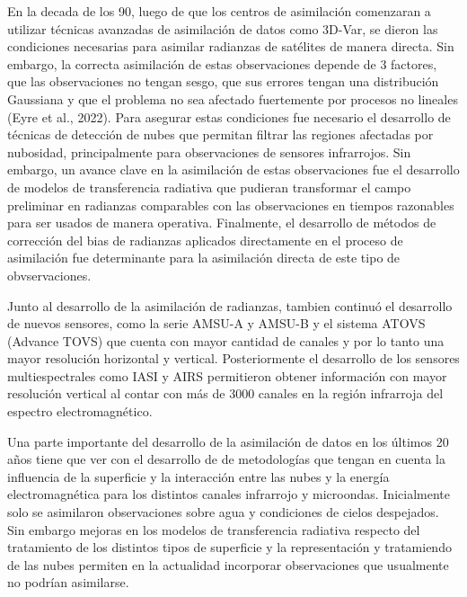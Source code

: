 \documentclass[12pt,twoside]{reedthesis}
\begin{document}
En la decada de los 90, luego de que los centros de asimilación comenzaran a utilizar técnicas avanzadas de asimilación de datos como 3D-Var, se dieron las condiciones necesarias para asimilar radianzas de satélites de manera directa. Sin embargo, la correcta asimilación de estas observaciones depende de 3 factores, que las observaciones no tengan sesgo, que sus errores tengan una distribución Gaussiana y que el problema no sea afectado fuertemente por procesos no lineales (Eyre et al., 2022). Para asegurar estas condiciones fue necesario el desarrollo de técnicas de detección de nubes que permitan filtrar las regiones afectadas por nubosidad, principalmente para observaciones de sensores infrarrojos. Sin embargo, un avance clave en la asimilación de estas observaciones fue el desarrollo de modelos de transferencia radiativa que pudieran transformar el campo preliminar en radianzas comparables con las observaciones en tiempos razonables para ser usados de manera operativa. Finalmente, el desarrollo de métodos de corrección del bias de radianzas aplicados directamente en el proceso de asimilación fue determinante para la asimilación directa de este tipo de obvservaciones.

Junto al desarrollo de la asimilación de radianzas, tambien continuó el desarrollo de nuevos sensores, como la serie AMSU-A y AMSU-B y el sistema ATOVS (Advance TOVS) que cuenta con mayor cantidad de canales y por lo tanto una mayor resolución horizontal y vertical. Posteriormente el desarrollo de los sensores multiespectrales como IASI y AIRS permitieron obtener información con mayor resolución vertical al contar con más de 3000 canales en la región infrarroja del espectro electromagnético.

Una parte importante del desarrollo de la asimilación de datos en los últimos 20 años tiene que ver con el desarrollo de de metodologías que tengan en cuenta la influencia de la superficie y la interacción entre las nubes y la energía electromagnética para los distintos canales infrarrojo y microondas. Inicialmente solo se asimilaron observaciones sobre agua y condiciones de cielos despejados. Sin embargo mejoras en los modelos de transferencia radiativa respecto del tratamiento de los distintos tipos de superficie y la representación y tratamiendo de las nubes permiten en la actualidad incorporar observaciones que usualmente no podrían asimilarse.
\end{document}
